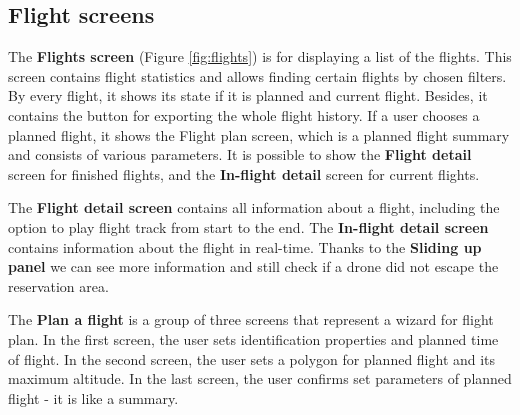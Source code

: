 \subsection{Flight screens}\label{subsec:flight-screens}
The \textbf{Flights screen} (Figure \ref{fig:flights}) is for displaying a list of the flights.
This screen contains flight statistics and allows finding certain flights by chosen filters.
By every flight, it shows its state if it is planned and current flight.
Besides, it contains the button for exporting the whole flight history.
If a user chooses a planned flight, it shows the Flight plan screen, which is a planned flight summary and consists of various parameters.
It is possible to show the \textbf{Flight detail} screen for finished flights, and the \textbf{In-flight detail} screen for current flights.

The \textbf{Flight detail screen} contains all information about a flight, including the option to play flight track from start to the end.
The \textbf{In-flight detail screen} contains information about the flight in real-time.
Thanks to the \textbf{Sliding up panel} we can see more information and still check if a drone did not escape the reservation area.

The \textbf{Plan a flight} is a group of three screens that represent a wizard for flight plan.
In the first screen, the user sets identification properties and planned time of flight.
In the second screen, the user sets a polygon for planned flight and its maximum altitude.
In the last screen, the user confirms set parameters of planned flight - it is like a summary.


